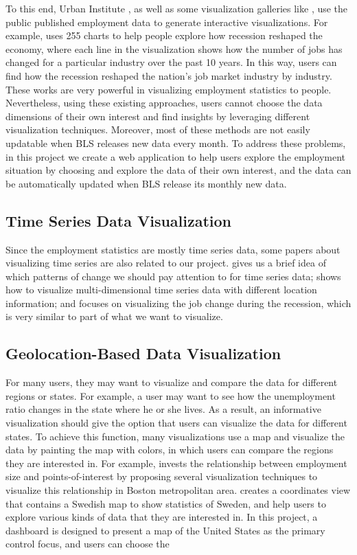 \documentclass{sigchi}
\begin{document}
To this end, Urban Institute \cite{urban_website}, as well as some visualization galleries like \cite{David2014, Jeremy2014,Tableau}, use the public published employment data to generate interactive visualizations. For example, \cite{Jeremy2014} uses 255 charts to help people explore how recession reshaped the economy, where each line in the visualization shows how the number of jobs has changed for a particular industry over the past 10 years. In this way, users can find how the recession reshaped the nation’s job market industry by industry. These works are very powerful in visualizing employment statistics to people. Nevertheless, using these existing approaches, users cannot choose the data dimensions of their own interest and find insights by leveraging different visualization techniques. Moreover, most of these methods are not easily updatable when BLS releases new data every month. To address these problems, in this project we create a web application to help users explore the employment situation by choosing and explore the data of their own interest, and the data can be automatically updated when BLS release its monthly new data.


\subsection{Time Series Data Visualization}
Since the employment statistics are mostly time series data, some papers \cite{Few2007,Roger2008,Jeremy2014} about visualizing time series are also related to our project. \cite{Few2007}  gives us a brief idea of which patterns of change we should pay attention to for time series data; \cite{Roger2008} shows how to visualize multi-dimensional time series data with different location information; and \cite{Jeremy2014} focuses on visualizing the job change during the recession, which is very similar to part of what we want to visualize.


\subsection{Geolocation-Based Data Visualization}
For many users, they may want to visualize and compare the data for different regions or states. For example, a user may want to see how the unemployment ratio changes in the state where he or she lives. As a result, an informative visualization should give the option that users can visualize the data for different states. To achieve this function, many visualizations use a map and visualize the data by painting the map with colors, in which users can compare the regions they are interested in. For example, \cite{Rodrigues2013} invests the relationship between employment size and points-of-interest by proposing several visualization techniques to visualize this relationship in Boston metropolitan area. \cite{Feldt2005} creates a coordinates view that contains a Swedish map to show statistics of Sweden, and help users to explore various kinds of data that they are interested in. In this project, a dashboard is designed to present a map of the United States as the primary control focus, and users can choose the
\end{document}
